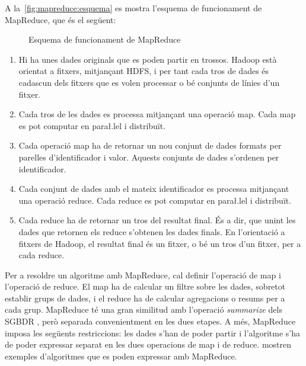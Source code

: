 A la~\autoref{fig:mapreduce:esquema}
es mostra l'esquema de funcionament de MapReduce, que és el següent:


\begin{figure}[tp]
  \centering
  
  \caption{Esquema de funcionament de MapReduce}
  \label{fig:mapreduce:esquema}
\end{figure}



\begin{enumerate}

\item Hi ha unes dades originals que es poden partir en
  trossos. Hadoop està orientat a fitxers, mitjançant \gls{HDFS}, i
  per tant cada tros de dades és cadascun dels fitxers que es volen
  processar o bé conjunts de línies d'un fitxer.

\item Cada tros de les dades es processa mitjançant una operació
  map. Cada map es pot computar en para\l.lel i distribuït.

\item Cada operació map ha de retornar un nou conjunt de dades
  formats per parelles d'identificador i valor. Aquests conjunts de
  dades s'ordenen per identificador. 

\item Cada conjunt de dades amb el mateix identificador es processa
  mitjançant una operació reduce. Cada reduce es pot computar en
  para\l.lel i distribuït.

\item Cada reduce ha de retornar un tros del resultat final. És a dir,
  que unint les dades que retornen els reduce s'obtenen les dades
  finals. En l'orientació a fitxers de Hadoop, el resultat final és un
  fitxer, o bé un tros d'un fitxer, per a cada reduce.

\end{enumerate}



Per a resoldre un algoritme amb MapReduce, cal definir l'operació de
map i l'operació de reduce. El map ha de calcular un filtre sobre les
dades, sobretot establir grups de dades, i el reduce ha de calcular
agregacions o resums per a cada grup. MapReduce té una gran similitud
amb l'operació \emph{summarize} dels
\gls{SGBDR} \parencite[cap.~7]{date04:introduction8}, però separada
convenientment en les dues etapes.  A més, MapReduce imposa les
següents restriccions: les dades s'han de poder partir i l'algoritme
s'ha de poder expressar separat en les dues operacions de map i de
reduce.  \textcite{deanghemawat04:mapreduce} mostren exemples
d'algoritmes que es poden expressar amb MapReduce.



